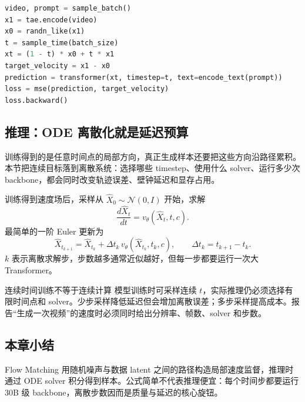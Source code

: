\begin{lstlisting}[language=Python,caption={条件 Flow Matching 的单步训练伪代码}]
video, prompt = sample_batch()
x1 = tae.encode(video)
x0 = randn_like(x1)
t = sample_time(batch_size)
xt = (1 - t) * x0 + t * x1
target_velocity = x1 - x0
prediction = transformer(xt, timestep=t, text=encode_text(prompt))
loss = mse(prediction, target_velocity)
loss.backward()
\end{lstlisting}

\subsection{推理：ODE 离散化就是延迟预算}

训练得到的是任意时间点的局部方向，真正生成样本还要把这些方向沿路径累积。本节把连续目标落到离散系统：选择哪些 timestep、使用什么 solver、运行多少次 backbone，都会同时改变轨迹误差、壁钟延迟和显存占用。

训练得到速度场后，采样从 $\hat X_0\sim\mathcal N(0,I)$ 开始，求解
\[
\frac{d\hat X_t}{dt}=v_\theta(\hat X_t,t,c).
\]
最简单的一阶 Euler 更新为
\[
\hat X_{t_{k+1}}
=\hat X_{t_k}+\Delta t_k\,v_\theta(\hat X_{t_k},t_k,c),
\qquad \Delta t_k=t_{k+1}-t_k.
\]
$k$ 表示离散求解步，步数越多通常近似越好，但每一步都要运行一次大 Transformer。


\begin{warningbox}{连续时间训练不等于连续计算}
模型训练时可采样连续 $t$，实际推理仍必须选择有限时间点和 solver。少步采样降低延迟但会增加离散误差；多步采样提高成本。报告“生成一次视频”的速度时必须同时给出分辨率、帧数、solver 和步数。
\end{warningbox}


\subsection{本章小结}

Flow Matching 用随机噪声与数据 latent 之间的路径构造局部速度监督，推理时通过 ODE solver 积分得到样本。公式简单不代表推理便宜：每个时间步都要运行 30B 级 backbone，离散步数因而是质量与延迟的核心旋钮。

